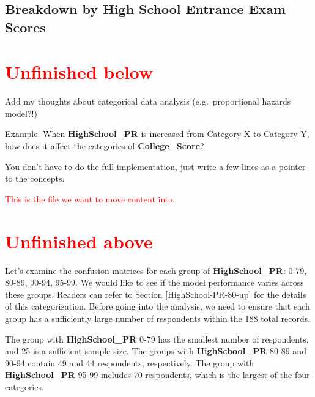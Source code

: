 \documentclass[
]{article}
\begin{document}
\hypertarget{another-breakdown}{%
\subsection{Breakdown by High School Entrance Exam
Scores}\label{another-breakdown}}

\section*{\textcolor{red}{Unfinished below}}

Add my thoughts about categorical data analysis (e.g.~proportional
hazards model?!)

Example: When \textbf{HighSchool\_PR} is increased from Category X to
Category Y, how does it affect the categories of
\textbf{College\_Score}?

You don't have to do the full implementation, just write a few lines as
a pointer to the concepts.

\textcolor{red}{This is the file we want to move content into.}

\section*{\textcolor{red}{Unfinished above}}

Let's examine the confusion matrices for each group of
\textbf{HighSchool\_PR}: 0-79, 80-89, 90-94, 95-99. We would like to see
if the model performance varies across these groups. Readers can refer
to Section \ref{HighSchool-PR-80-up} for the details of this
categorization. Before going into the analysis, we need to ensure that
each group has a sufficiently large number of respondents within the 188
total records.

The group with \textbf{HighSchool\_PR} 0-79 has the smallest number of
respondents, and 25 is a sufficient sample size. The groups with
\textbf{HighSchool\_PR} 80-89 and 90-94 contain 49 and 44 respondents,
respectively. The group with \textbf{HighSchool\_PR} 95-99 includes 70
respondents, which is the largest of the four categories.
\end{document}

